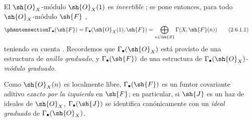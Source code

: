 \documentclass[oneside,10pt]{amsart}
\let\EGAOriginalLabel\label
\renewcommand{\label}[1]{\phantomsection\EGAOriginalLabel{#1}}
\begin{document}
\begin{env}[2.6.1]
\label{II.2.6.1}
El $\sh{O}_X$-módulo $\sh{O}_X(1)$ es \emph{invertible} ; se pone entonces, para todo $\sh{O}_X$-módulo $\sh{F}$ ,
\[
\label{II.2.6.1.1}
  \Gamma_\bullet(\sh{F})
  =\Gamma_\bullet(\sh{O}_X(1),\sh{F})
  =\bigoplus_{n\in\bb{Z}}\Gamma(X,\sh{F}(n))
\tag{2.6.1.1}
\]
teniendo en cuenta .
Recordemos  que $\Gamma_\bullet(\sh{O}_X)$ está provisto de una estructura de \emph{anillo graduado}, y $\Gamma_\bullet(\sh{F})$ de una estructura de \emph{$\Gamma_\bullet(\sh{O}_X)$-módulo graduado}.

Como $\sh{O}_X(n)$ es localmente libre, $\Gamma_\bullet(\sh{F})$ es un funtor covariante aditivo \emph{exacto por la izquierda} en $\sh{F}$; en particular, si $\sh{J}$ es un haz de ideales de $\sh{O}_X$, $\Gamma_\bullet(\sh{J})$ se identifica canónicamente con un \emph{ideal graduado} de $\Gamma_\bullet(\sh{O}_X)$.
\end{env}
\end{document}
